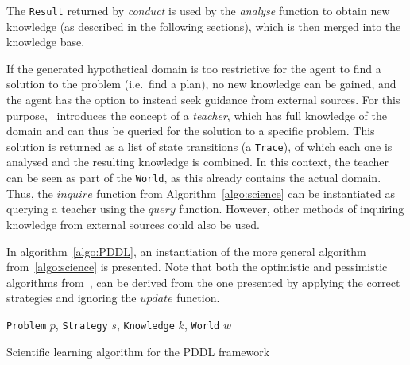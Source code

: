 \documentclass[../Master.tex]{subfiles}
\begin{document}
The \texttt{Result} returned by \textit{conduct} is used by the \textit{analyse} function to obtain new knowledge (as described in the following sections), which is then merged into the knowledge base.

If the generated hypothetical domain is too restrictive for the agent to find a solution to the problem (i.e.\ find a plan), no new knowledge can be gained, and the agent has the option to instead seek guidance from external sources. For this purpose,~\cite{Walsh2008} introduces the concept of a \textit{teacher}, which has full knowledge of the domain and can thus be queried for the solution to a specific problem. This solution is returned as a list of state transitions (a \texttt{Trace}), of which each one is analysed and the resulting knowledge is combined. In this context, the teacher can be seen as part of the \texttt{World}, as this already contains the actual domain. Thus, the $inquire$ function from Algorithm~\ref{algo:science} can be instantiated as querying a teacher using the $query$ function. However, other methods of inquiring knowledge from external sources could also be used.

In algorithm~\ref{algo:PDDL}, an instantiation of the more general algorithm from~\ref{algo:science} is presented. Note that both the optimistic and pessimistic algorithms from~\cite{Walsh2008}, can be derived from the one presented by applying the correct strategies and ignoring the $update$ function. 


\begin{algorithm}
    \begin{algorithmic}
         {\texttt{Problem} $p$, \texttt{Strategy} $s$, \texttt{Knowledge} $k$, \texttt{World} $w$}
                \Else%
                    \EndFor%
                \EndIf%
            \EndWhile%
        \EndFunction%
    \end{algorithmic}
    \caption{Scientific learning algorithm for the PDDL framework}\label{algo:PDDL}
\end{algorithm}
\end{document}
